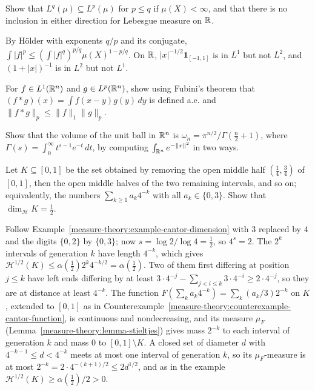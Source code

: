 \begin{exercise}\label{measure-theory:exercise-lp-inclusions}
Show that $L^q(\mu) \subseteq L^p(\mu)$ for $p \leq q$ if $\mu(X) < \infty$, and that there is no inclusion in either direction for Lebesgue measure on $\mathbb{R}$.
\end{exercise}

\begin{solution}
By H\"older with exponents $q/p$ and its conjugate, $\int|f|^p \leq (\int|f|^q)^{p/q}\mu(X)^{1 - p/q}$. On $\mathbb{R}$, $|x|^{-1/2}\mathbf{1}_{[-1,1]}$ is in $L^1$ but not $L^2$, and $(1 + |x|)^{-1}$ is in $L^2$ but not $L^1$.
\end{solution}

\begin{exercise}\label{measure-theory:exercise-convolution}
For $f \in L^1(\mathbb{R}^n)$ and $g \in L^p(\mathbb{R}^n)$, show using Fubini's theorem that $(f * g)(x) = \int f(x - y)g(y)\,dy$ is defined a.e. and $\|f * g\|_p \leq \|f\|_1\|g\|_p$.
\end{exercise}

\begin{exercise}\label{measure-theory:exercise-ball-volume}
Show that the volume of the unit ball in $\mathbb{R}^n$ is $\omega_n = \pi^{n/2}/\Gamma(\frac n2 + 1)$, where $\Gamma(s) = \int_0^\infty t^{s-1}e^{-t}\,dt$, by computing $\int_{\mathbb{R}^n}e^{-\|x\|^2}$ in two ways.
\end{exercise}

\begin{exercise}\label{measure-theory:exercise-middle-half-cantor}
Let $K \subseteq [0, 1]$ be the set obtained by removing the open middle half $(\frac14, \frac34)$ of $[0, 1]$, then the open middle halves of the two remaining intervals, and so on; equivalently, the
numbers $\sum_{k \geq 1}a_k4^{-k}$ with all $a_k \in \{0, 3\}$. Show that $\dim_{\mathcal{H}}K = \frac12$.
\end{exercise}

\begin{solution}
Follow Example~\ref{measure-theory:example-cantor-dimension} with $3$ replaced by $4$ and the digits $\{0, 2\}$ by $\{0, 3\}$; now $s = \log 2/\log 4 = \frac12$, so $4^s = 2$. The $2^k$ intervals of
generation $k$ have length $4^{-k}$, which gives $\mathcal{H}^{1/2}(K) \leq \alpha(\frac12)2^k4^{-k/2} = \alpha(\frac12)$. Two of them first differing at position $j \leq k$ have left ends differing by at least
$3 \cdot 4^{-j} - \sum_{j < i \leq k}3 \cdot 4^{-i} \geq 2 \cdot 4^{-j}$, so they are at distance at least $4^{-k}$. The function $F(\sum_ka_k4^{-k}) = \sum_k(a_k/3)2^{-k}$ on $K$, extended to
$[0, 1]$ as in Counterexample~\ref{measure-theory:counterexample-cantor-function}, is continuous and nondecreasing, and its measure $\mu_F$ (Lemma~\ref{measure-theory:lemma-stieltjes}) gives mass
$2^{-k}$ to each interval of generation $k$ and mass $0$ to $[0, 1] \setminus K$. A closed set of diameter $d$ with $4^{-k-1} \leq d < 4^{-k}$ meets at most one interval of generation $k$, so its
$\mu_F$-measure is at most $2^{-k} = 2 \cdot 4^{-(k+1)/2} \leq 2d^{1/2}$, and as in the example $\mathcal{H}^{1/2}(K) \geq \alpha(\frac12)/2 > 0$.
\end{solution}

